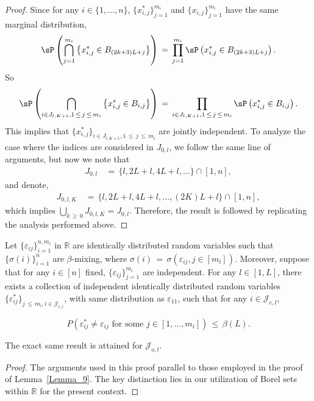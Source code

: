 \documentclass[twoside,11pt]{article}
\begin{document}
\begin{proof}
Since for any \( i \in \{1, \ldots, n\} \), \(\{x_{i,j}^*\}_{j=1}^{m_i}\) and \(\{x_{i,j}\}_{j=1}^{m_i}\) have the same marginal distribution,
\begin{align}
    \sP\left(\bigcap_{j=1}^{m_i} \left\{x_{i,j}^* \in B_{(2k+3)L+j}\right\}\right) \,=\, \prod_{j=1}^{m_i} \sP\left(x_{i,j}^* \in B_{(2k+3)L+j}\right).
\end{align}
So
\begin{align}
    \sP\left(\bigcap_{i \in J_{l,K+1}, 1 \,\leq\, j \,\leq\, m_i} \left\{x_{i,j}^* \in B_{i,j}\right\}\right) \,=\, \prod_{i \in J_{l,K+1}, 1 \,\leq\, j \,\leq\, m_i} \sP\left(x_{i,j}^* \in B_{i,j}\right).
\end{align}
This implies that \(\{x_{i,j}^*\}_{i\in J_{l,K+1},1\,\leq\, j\,\leq\, m_i}\) are jointly independent. To analyze the case where the indices are considered in \(J_{0,l}\), we follow the same line of arguments, but now we note that
\begin{align}
    J_{0,l} &\,=\, \{l,2L + l, 4L + l, \ldots \} \cap [1,n],
\end{align}
and denote,
\begin{align}
    J_{0,l,K} &\,=\, \{l, 2L + l, 4L + l, \ldots, (2K)L + l\} \cap [1,n],
\end{align}
which implies \(\bigcup_{k \,\geq\, 0} J_{0,l,K} = J_{0,l}\). Therefore, the result is followed by replicating the analysis performed above. 
\end{proof}

\begin{lemma}
\label{Lemma 10.} Let \(\{\varepsilon_{ij}\}^{n,m_i}_{i=1}\) in \(\mathbb{R}\) are identically distributed random variables such that \(\{\sigma(i)\}^{n}_{i=1}\) are \(\beta\)-mixing, where \(\sigma(i) \,=\, \sigma(\varepsilon_{ij}, j \in [m_i])\). Moreover, suppose that for any \(i \in [n]\) fixed, \(\{\varepsilon_{ij}\}^{m_i}_{j=1}\) are independent. For any \(l \in [1, L]\), there exists a collection of independent identically distributed random variables \(\{\varepsilon_{ij}^*\}_{j \,\leq\, m_i, i \in \mathcal{J}_{e,l}}\), with same distribution as \(\varepsilon_{11}\), such that for any \(i \in \mathcal{J}_{e,l}\),

\[
P(\varepsilon_{ij}^* \neq \varepsilon_{ij} \text{ for some } j \in [1, \ldots, m_i]) \,\leq\, \beta(L).
\]

The exact same result is attained for \(\mathcal{J}_{o,l}\).
\end{lemma}

\begin{proof} The arguments used in this proof parallel to those employed in the proof of Lemma~\ref{Lemma_9}. The key distinction lies in our utilization of Borel sets within \(\mathbb{R}\) for the present context. 
\end{proof}
\end{document}
